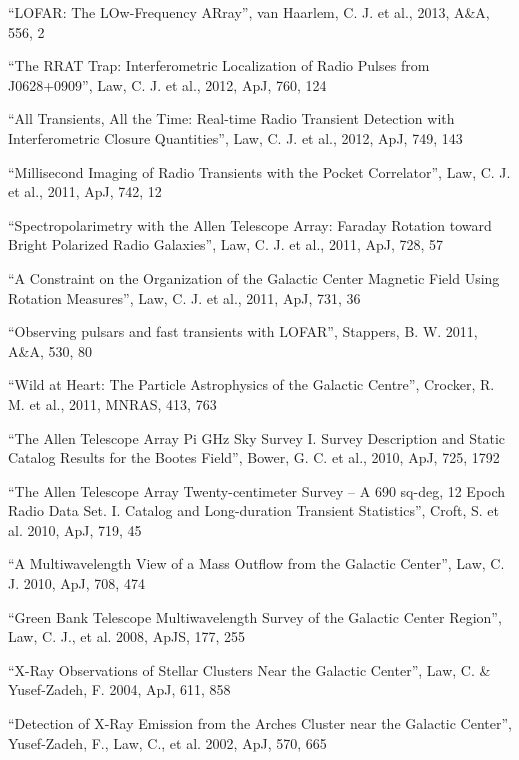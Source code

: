 \documentclass[11pt]{article}
\begin{document}
\begin{bibsection}

	\item ``LOFAR: The LOw-Frequency ARray'', van Haarlem, C. J. et al., 2013, A\&A, 556, 2

	\item ``The RRAT Trap: Interferometric Localization of Radio Pulses from J0628+0909'', Law, C. J. et al., 2012, ApJ, 760, 124

	\item ``All Transients, All the Time: Real-time Radio Transient Detection with Interferometric Closure Quantities'',  Law, C. J. et al., 2012, ApJ, 749, 143

	\item ``Millisecond Imaging of Radio Transients with the Pocket Correlator'',  Law, C. J. et al., 2011, ApJ, 742, 12

	\item ``Spectropolarimetry with the Allen Telescope Array:  Faraday Rotation toward Bright Polarized Radio Galaxies'',  Law, C. J. et al., 2011, ApJ, 728, 57

	\item ``A Constraint on the Organization of the Galactic Center Magnetic Field Using Rotation Measures'',  Law, C. J. et al., 2011, ApJ, 731, 36

	\item ``Observing pulsars and fast transients with LOFAR'',  Stappers, B. W. 2011, A\&A, 530, 80

	\item ``Wild at Heart: The Particle Astrophysics of the Galactic Centre'',  Crocker, R. M. et al., 2011, MNRAS, 413, 763

	\item ``The Allen Telescope Array Pi GHz Sky Survey I. Survey Description and Static Catalog Results for the Bootes Field'',  Bower, G. C. et al., 2010, ApJ, 725, 1792  

	\item ``The Allen Telescope Array Twenty-centimeter Survey -- A 690 sq-deg, 12 Epoch Radio Data Set. I. Catalog and Long-duration Transient Statistics'',  Croft, S. et al. 2010, ApJ, 719, 45

	\item ``A Multiwavelength View of a Mass Outflow from the Galactic Center'',  Law, C. J. 2010, ApJ, 708, 474

	\item ``Green Bank Telescope Multiwavelength Survey of the Galactic Center Region'',  Law, C. J., et al. 2008, ApJS, 177, 255

	\item ``X-Ray Observations of Stellar Clusters Near the Galactic Center'',  Law, C. \& Yusef-Zadeh, F. 2004, ApJ, 611, 858

	\item ``Detection of X-Ray Emission from the Arches Cluster near the Galactic Center'',  Yusef-Zadeh, F., Law, C., et al. 2002, ApJ, 570, 665

\end{bibsection}
\end{document}
